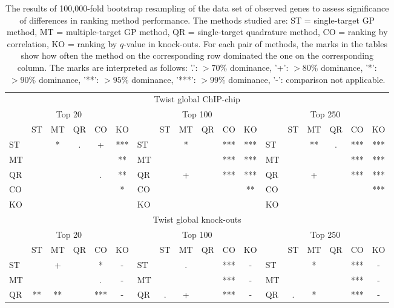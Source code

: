 \documentclass{article}
\begin{document}
\begin{longtable}[c]{lccccc|lccccc|lccccc}
  \caption{The results of 100,000-fold bootstrap resampling of
the data set of observed genes to assess
significance of differences in ranking method performance.  The methods
studied are: ST = single-target GP method, MT = 
multiple-target GP method, QR = single-target quadrature method,
CO = ranking by correlation, KO = ranking by
$q$-value in knock-outs.  For each pair of methods, the marks in the
tables show how often the method on the corresponding row dominated
the one on the corresponding column.  The marks are interpreted as
follows: '.': $> 70 \%$ dominance, '+': $> 80 \%$ dominance,
'*': $> 90 \%$ dominance, '**': $> 95 \%$ dominance, '***': $> 99 \%$
dominance, '-': comparison not applicable.} \\
\multicolumn{18}{c}{Twist global ChIP-chip} \\
\multicolumn{6}{c|}{Top 20} &\multicolumn{6}{c|}{Top 100}  & \multicolumn{6}{c}{Top 250}\\
    & ST  & MT  & QR  & CO  & KO &     & ST  & MT  & QR  & CO  & KO  &     & ST  & MT  & QR  & CO  & KO \\
ST &     & *   & .   & +   & *** & ST &     & *   &     & *** & *** & ST &     & **  & .   & *** & ***\\
MT &     &     &     &     & **  & MT &     &     &     & *** & *** & MT &     &     &     & *** & ***\\
QR &     &     &     & .   & **  & QR &     & +   &     & *** & *** & QR &     & +   &     & *** & ***\\
CO &     &     &     &     & *   & CO &     &     &     &     & **  & CO &     &     &     &     & ***\\
KO &     &     &     &     &     & KO &     &     &     &     &     & KO &     &     &     &     &    \\
\multicolumn{18}{c}{Twist global knock-outs} \\
\multicolumn{6}{c|}{Top 20} &\multicolumn{6}{c|}{Top 100}  & \multicolumn{6}{c}{Top 250}\\
    & ST  & MT  & QR  & CO  & KO &     & ST  & MT  & QR  & CO  & KO  &     & ST  & MT  & QR  & CO  & KO \\
ST &     & +   &     & *   & -   & ST &     & .   &     & *** & -   & ST &     & *   &     & *** & -  \\
MT &     &     &     & .   & -   & MT &     &     &     & *** & -   & MT &     &     &     & *** & -  \\
QR & **  & **  &     & *** & -   & QR & .   & +   &     & *** & -   & QR & .   & *   &     & *** & -  \\

\end{longtable}
\end{document}
